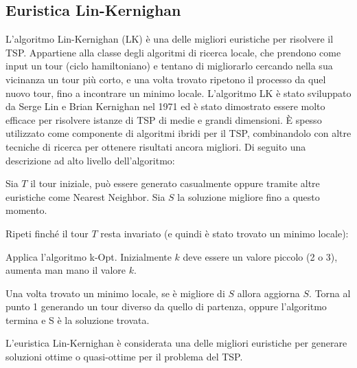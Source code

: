 \documentclass[a4paper,12pt]{report}
\begin{document}
\subsection{Euristica Lin-Kernighan}
L'algoritmo Lin-Kernighan (LK)\cite{LK} è una delle migliori euristiche per risolvere il TSP. Appartiene alla classe degli algoritmi di ricerca locale, che prendono come input un tour (ciclo hamiltoniano) e tentano di migliorarlo cercando nella sua vicinanza un tour più corto, e una volta trovato ripetono il processo da quel nuovo tour, fino a incontrare un minimo locale.
L'algoritmo LK è stato sviluppato da Serge Lin e Brian Kernighan nel 1971 ed è stato dimostrato essere molto efficace per risolvere istanze di TSP di medie e grandi dimensioni. È spesso utilizzato come componente di algoritmi ibridi per il TSP, combinandolo con altre tecniche di ricerca per ottenere risultati ancora migliori. Di seguito una descrizione ad alto livello dell'algoritmo:
\begin{tcolorbox}[colframe=black,colback=white,boxrule=0.5pt, sharp corners]
  \begin{legal}
    \item Sia $T$ il tour iniziale, può essere generato casualmente oppure tramite altre euristiche come Nearest Neighbor. Sia $S$ la soluzione migliore fino a questo momento.
    \item Ripeti finché il tour $T$ resta invariato (e quindi è stato trovato un minimo locale):
    \begin{legal}
      \item Applica l'algoritmo k-Opt. Inizialmente $k$ deve essere un valore piccolo (2 o 3), aumenta man mano il valore $k$.
    \end{legal}
    \item Una volta trovato un minimo locale, se è migliore di $S$ allora aggiorna $S$. Torna al punto 1 generando un tour diverso da quello di partenza, oppure l'algoritmo termina e S è la soluzione trovata.
  \end{legal}
\end{tcolorbox}
\hfill \break
L'euristica Lin-Kernighan è considerata una delle migliori euristiche per generare soluzioni ottime o quasi-ottime per il problema del TSP\cite{Helsgaun}.
%

%
%
\end{document}
